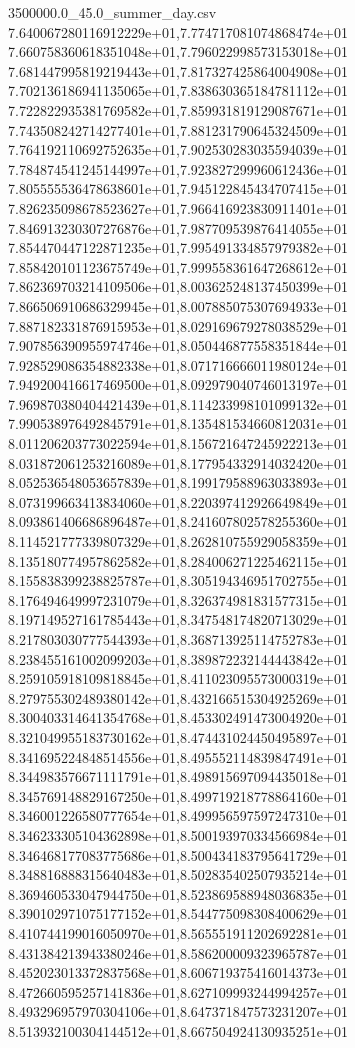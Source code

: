 \begin{filecontents*}{3500000.0_45.0_summer_day.csv}
7.640067280116912229e+01,7.774717081074868474e+01
7.660758360618351048e+01,7.796022998573153018e+01
7.681447995819219443e+01,7.817327425864004908e+01
7.702136186941135065e+01,7.838630365184781112e+01
7.722822935381769582e+01,7.859931819129087671e+01
7.743508242714277401e+01,7.881231790645324509e+01
7.764192110692752635e+01,7.902530283035594039e+01
7.784874541245144997e+01,7.923827299960612436e+01
7.805555536478638601e+01,7.945122845434707415e+01
7.826235098678523627e+01,7.966416923830911401e+01
7.846913230307276876e+01,7.987709539876414055e+01
7.854470447122871235e+01,7.995491334857979382e+01
7.858420101123675749e+01,7.999558361647268612e+01
7.862369703214109506e+01,8.003625248137450399e+01
7.866506910686329945e+01,8.007885075307694933e+01
7.887182331876915953e+01,8.029169679278038529e+01
7.907856390955974746e+01,8.050446877558351844e+01
7.928529086354882338e+01,8.071716666011980124e+01
7.949200416617469500e+01,8.092979040746013197e+01
7.969870380404421439e+01,8.114233998101099132e+01
7.990538976492845791e+01,8.135481534660812031e+01
8.011206203773022594e+01,8.156721647245922213e+01
8.031872061253216089e+01,8.177954332914032420e+01
8.052536548053657839e+01,8.199179588963033893e+01
8.073199663413834060e+01,8.220397412926649849e+01
8.093861406686896487e+01,8.241607802578255360e+01
8.114521777339807329e+01,8.262810755929058359e+01
8.135180774957862582e+01,8.284006271225462115e+01
8.155838399238825787e+01,8.305194346951702755e+01
8.176494649997231079e+01,8.326374981831577315e+01
8.197149527161785443e+01,8.347548174820713029e+01
8.217803030777544393e+01,8.368713925114752783e+01
8.238455161002099203e+01,8.389872232144443842e+01
8.259105918109818845e+01,8.411023095573000319e+01
8.279755302489380142e+01,8.432166515304925269e+01
8.300403314641354768e+01,8.453302491473004920e+01
8.321049955183730162e+01,8.474431024450495897e+01
8.341695224848514556e+01,8.495552114839847491e+01
8.344983576671111791e+01,8.498915697094435018e+01
8.345769148829167250e+01,8.499719218778864160e+01
8.346001226580777654e+01,8.499956597597247310e+01
8.346233305104362898e+01,8.500193970334566984e+01
8.346468177083775686e+01,8.500434183795641729e+01
8.348816888315640483e+01,8.502835402507935214e+01
8.369460533047944750e+01,8.523869588948036835e+01
8.390102971075177152e+01,8.544775098308400629e+01
8.410744199016050970e+01,8.565551911202692281e+01
8.431384213943380246e+01,8.586200009323965787e+01
8.452023013372837568e+01,8.606719375416014373e+01
8.472660595257141836e+01,8.627109993244994257e+01
8.493296957970304106e+01,8.647371847573231207e+01
8.513932100304144512e+01,8.667504924130935251e+01

\end{filecontents*}
